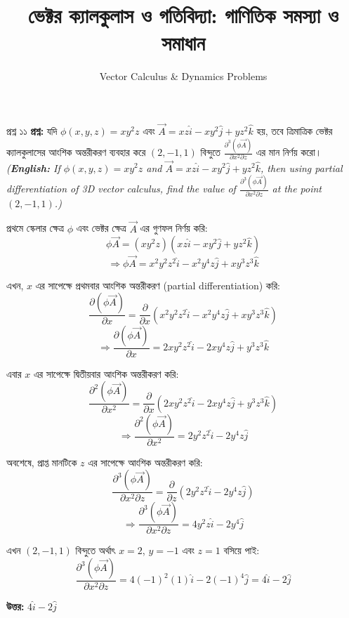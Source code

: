 \documentclass[11pt,a4paper]{article}
\title{\textbf{ভেক্টর ক্যালকুলাস ও গতিবিদ্যা: গাণিতিক সমস্যা ও সমাধান}}
\author{Vector Calculus \& Dynamics Problems}
\date{}
\begin{document}
\maketitle

\begin{qbox}{প্রশ্ন ১১}
\textbf{প্রশ্ন:} যদি $\phi(x,y,z) = xy^2z$ এবং $\vec{A} = xz\hat{i} - xy^2\hat{j} + yz^2\hat{k}$ হয়, তবে ত্রিমাত্রিক ভেক্টর ক্যালকুলাসের আংশিক অন্তরীকরণ ব্যবহার করে $(2, -1, 1)$ বিন্দুতে $\frac{\partial^3(\phi \vec{A})}{\partial x^2 \partial z}$ এর মান নির্ণয় করো। \\
\textit{(\textbf{English:} If $\phi(x,y,z) = xy^2z$ and $\vec{A} = xz\hat{i} - xy^2\hat{j} + yz^2\hat{k}$, then using partial differentiation of 3D vector calculus, find the value of $\frac{\partial^3(\phi \vec{A})}{\partial x^2 \partial z}$ at the point $(2, -1, 1)$.)}
\end{qbox}

\begin{solbox}
প্রথমে স্কেলার ক্ষেত্র $\phi$ এবং ভেক্টর ক্ষেত্র $\vec{A}$ এর গুণফল নির্ণয় করি:
$$\phi \vec{A} = (xy^2z)(xz\hat{i} - xy^2\hat{j} + yz^2\hat{k})$$
$$\Rightarrow \phi \vec{A} = x^2y^2z^2\hat{i} - x^2y^4z\hat{j} + xy^3z^3\hat{k}$$

এখন, $x$ এর সাপেক্ষে প্রথমবার আংশিক অন্তরীকরণ (partial differentiation) করি:
$$\frac{\partial(\phi \vec{A})}{\partial x} = \frac{\partial}{\partial x}(x^2y^2z^2\hat{i} - x^2y^4z\hat{j} + xy^3z^3\hat{k})$$
$$\Rightarrow \frac{\partial(\phi \vec{A})}{\partial x} = 2xy^2z^2\hat{i} - 2xy^4z\hat{j} + y^3z^3\hat{k}$$

এবার $x$ এর সাপেক্ষে দ্বিতীয়বার আংশিক অন্তরীকরণ করি:
$$\frac{\partial^2(\phi \vec{A})}{\partial x^2} = \frac{\partial}{\partial x}(2xy^2z^2\hat{i} - 2xy^4z\hat{j} + y^3z^3\hat{k})$$
$$\Rightarrow \frac{\partial^2(\phi \vec{A})}{\partial x^2} = 2y^2z^2\hat{i} - 2y^4z\hat{j}$$

অবশেষে, প্রাপ্ত মানটিকে $z$ এর সাপেক্ষে আংশিক অন্তরীকরণ করি:
$$\frac{\partial^3(\phi \vec{A})}{\partial x^2 \partial z} = \frac{\partial}{\partial z}(2y^2z^2\hat{i} - 2y^4z\hat{j})$$
$$\Rightarrow \frac{\partial^3(\phi \vec{A})}{\partial x^2 \partial z} = 4y^2z\hat{i} - 2y^4\hat{j}$$

এখন $(2, -1, 1)$ বিন্দুতে অর্থাৎ $x = 2$, $y = -1$ এবং $z = 1$ বসিয়ে পাই:
$$\frac{\partial^3(\phi \vec{A})}{\partial x^2 \partial z} = 4(-1)^2(1)\hat{i} - 2(-1)^4\hat{j} = 4\hat{i} - 2\hat{j}$$

\textbf{উত্তর:} $4\hat{i} - 2\hat{j}$
\end{solbox}
\end{document}
